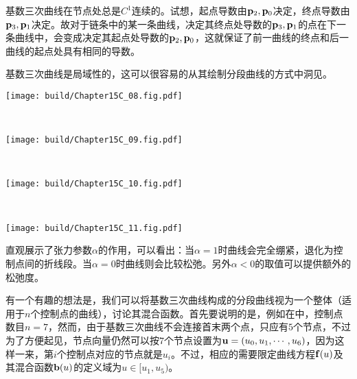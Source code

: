 基数三次曲线在节点处总是$C^1$连续的。试想，起点导数由$\vb{p}_2,\vb{p}_0$决定，终点导数由$\vb{p}_3,\vb{p}_1$决定。故对于链条中的某一条曲线，决定其终点处导数的$\vb{p}_3,\vb{p}_1$的点在下一条曲线中，会变成决定其起点处导数的$\vb{p}_2,\vb{p}_0$，这就保证了前一曲线的终点和后一曲线的起点处具有相同的导数。

基数三次曲线是局域性的，这可以很容易的从其绘制分段曲线的方式中洞见。

\begin{Figure}[基数三次曲线构成的分段曲线]
    \begin{FigureSub}[$\alpha=1.0$;张力1]
        \texttt{[image: build/Chapter15C\_08.fig.pdf]}
    \end{FigureSub} \\ \vspace{0.25cm}
    \begin{FigureSub}[$\alpha=0.0$;张力0]
        \texttt{[image: build/Chapter15C\_09.fig.pdf]}
    \end{FigureSub} \\ \vspace{0.25cm}
    \begin{FigureSub}[$\alpha=-1.0$;张力-1]
        \texttt{[image: build/Chapter15C\_10.fig.pdf]}
    \end{FigureSub} \\ \vspace{0.25cm}
    \begin{FigureSub}[$\alpha=-2.0$;张力-2]
        \texttt{[image: build/Chapter15C\_11.fig.pdf]}
    \end{FigureSub}
\end{Figure}

直观展示了张力参数$\alpha$的作用，可以看出：当$\alpha=1$时曲线会完全绷紧，退化为控制点间的折线段。当$\alpha=0$时曲线则会比较松弛。另外$\alpha<0$的取值可以提供额外的松弛度。


有一个有趣的想法是，我们可以将基数三次曲线构成的分段曲线视为一个整体（适用于$n$个控制点的曲线），讨论其混合函数。首先要说明的是，例如在中，控制点数目$n=7$，然而，由于基数三次曲线不会连接首末两个点，只应有$5$个节点，不过为了方便起见，节点向量仍然可以按$7$个节点设置为$\vb{u}=(u_0,u_1,\cdots,u_6)$，因为这样一来，第$i$个控制点对应的节点就是$u_i$。不过，相应的需要限定曲线方程$\vb{f}(u)$及其混合函数$\vb{b}(u)$的定义域为$u\in[u_1,u_5)$。

